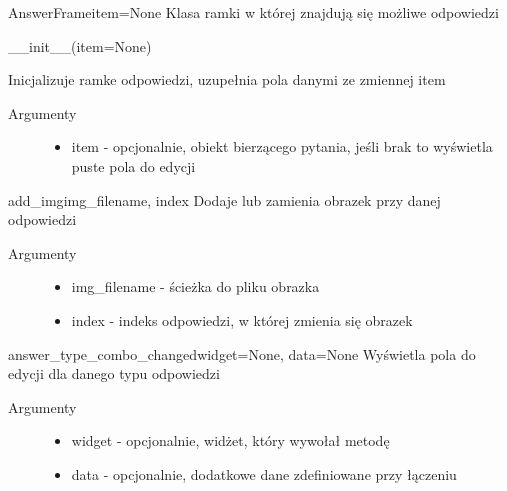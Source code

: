 \documentclass[letterpaper,10pt,polish]{manual}
\begin{document}
\hypertarget{AnswerFrame.AnswerFrame}{}\begin{classdesc}{AnswerFrame}{item=None}
Klasa ramki w której znajdują się możliwe odpowiedzi

\_\_init\_\_(item=None)

Inicjalizuje ramke odpowiedzi, uzupełnia pola danymi ze zmiennej item
\begin{description}
\item[Argumenty] \leavevmode\begin{itemize}
\item {} 
item - opcjonalnie, obiekt bierzącego pytania, jeśli brak to wyświetla puste pola do edycji

\end{itemize}

\end{description}

\hypertarget{AnswerFrame.AnswerFrame.add\_img}{}\begin{methoddesc}{add\_img}{img\_filename, index}
Dodaje lub zamienia obrazek przy danej odpowiedzi
\begin{description}
\item[Argumenty] \leavevmode\begin{itemize}
\item {} 
img\_filename - ścieżka do pliku obrazka

\item {} 
index - indeks odpowiedzi, w której zmienia się obrazek

\end{itemize}

\end{description}
\end{methoddesc}

\hypertarget{AnswerFrame.AnswerFrame.answer\_type\_combo\_changed}{}\begin{methoddesc}{answer\_type\_combo\_changed}{widget=None, data=None}
Wyświetla pola do edycji dla danego typu odpowiedzi
\begin{description}
\item[Argumenty] \leavevmode\begin{itemize}
\item {} 
widget - opcjonalnie, widżet, który wywołał metodę

\item {} 
data - opcjonalnie, dodatkowe dane zdefiniowane przy łączeniu


\end{itemize}
\end{description}
\end{methoddesc}
\end{classdesc}
\end{document}
